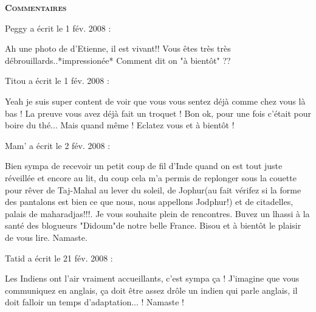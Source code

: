 \bigskip
\textbf{\textsc{Commentaires}}

\medskip
Peggy a écrit le 1 fév. 2008 :
\begin{displayquote}
Ah une photo de d'Etienne, il est vivant!!
Vous êtes très très débrouillards..*impressionée*
Comment dit on "à bientôt" ??
\end{displayquote}

\medskip
Titou a écrit le 1 fév. 2008 :
\begin{displayquote}
Yeah je suis super content de voir que vous vous sentez déjà comme chez vous là bas ! La preuve vous avez déjà fait un troquet ! Bon ok, pour une fois c'était pour boire du thé... Mais quand même ! Eclatez vous et à bientôt !
\end{displayquote}

\medskip
Mam' a écrit le 2 fév. 2008 :
\begin{displayquote}
Bien sympa de recevoir un petit coup de fil d'Inde quand on est tout juste réveillée et encore au lit, du coup cela m'a permis de replonger sous la couette pour rêver de Taj-Mahal au lever du soleil, de Jophur(au fait vérifez si la forme des pantalons est bien ce que nous, nous appellons Jodphur!) et de citadelles, palais de maharadjas!!!. Je vous souhaite plein de rencontres. Buvez un lhassi à la santé des blogueurs "Didoum"de notre belle France. Bisou et à bientôt le plaisir de vous lire. Namaste.
\end{displayquote}

\medskip
Tatid a écrit le 21 fév. 2008 :
\begin{displayquote}
Les Indiens ont l'air vraiment accueillants, c'est sympa ça ! J'imagine que vous communiquez en anglais, ça doit être assez drôle un indien qui parle anglais, il doit falloir un temps d'adaptation... !
Namaste !
\end{displayquote}

\vfill
